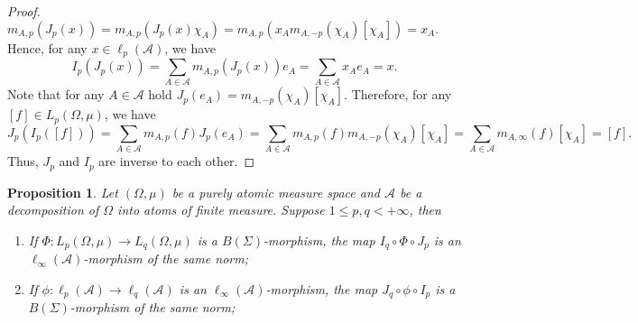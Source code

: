 \documentclass[12pt]{article}
\newtheorem{proposition}[theorem]{Proposition}
\begin{document}
\begin{proof}
    $
        m_{A,p}(J_p(x))
        =m_{A,p}(J_p(x)\chi_A)
        =m_{A,p}(x_A m_{A,-p}(\chi_A)[\chi_A])
        =x_A.
    $
    Hence, for any $x\in\ell_p(\mathcal{A})$, we have
    \[
        I_p(J_p(x))
        =\sum_{A\in\mathcal{A}}m_{A,p}(J_p(x))e_A
        =\sum_{A\in\mathcal{A}}x_A e_A
        =x.
    \]
    Note that for any $A\in\mathcal{A}$ hold
    $
        J_p(e_A)
        =m_{A,-p}(\chi_{A})[\chi_{A}].
    $
    Therefore, for any $[f]\in L_p(\Omega,\mu)$, we have
    \[
        J_p(I_p([f]))
        =\sum_{A\in\mathcal{A}}m_{A,p}(f)J_p(e_A)
        =\sum_{A\in\mathcal{A}}m_{A,p}(f)m_{A,-p}(\chi_A)[\chi_A]
        =\sum_{A\in\mathcal{A}}m_{A,\infty}(f)[\chi_A]
        =[f].
    \]
    Thus, $J_p$ and $I_p$ are inverse to each other.
\end{proof}

\begin{proposition}\label{SwtchMorphBtwnAtomMeasSp}
    Let $(\Omega,\mu)$ be a purely atomic measure space and $\mathcal{A}$ be a 
    decomposition of $\Omega$ into atoms of finite measure. 
    Suppose $1\leq p,q<+\infty$, then
    \begin{enumerate}[label = (\roman*)]
        \item If $\Phi:L_p(\Omega,\mu)\to L_q(\Omega,\mu)$ is 
        a $B(\Sigma)$-morphism, the map $I_q\circ \Phi\circ J_p$ is 
        an $\ell_\infty(\mathcal{A})$-morphism of the same norm;

        \item If $\phi:\ell_p(\mathcal{A})\to \ell_q(\mathcal{A})$ is 
        an $\ell_\infty(\mathcal{A})$-morphism, the 
        map $J_q\circ \phi\circ I_p$ is a $B(\Sigma)$-morphism of the same norm;
    \end{enumerate} 
\end{proposition}
\end{document}
